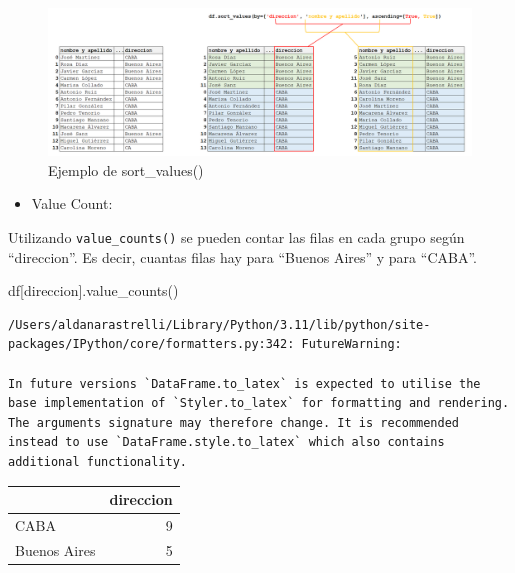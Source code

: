 \documentclass[
  letterpaper,
  DIV=11,
  numbers=noendperiod]{scrreprt}
\newenvironment{Shaded}{\begin{snugshade}}{\end{snugshade}}
\newcommand{\NormalTok}[1]{\textcolor[rgb]{0.00,0.23,0.31}{#1}}
\newcommand{\StringTok}[1]{\textcolor[rgb]{0.13,0.47,0.30}{#1}}
\providecommand{\tightlist}{%
  \setlength{\itemsep}{0pt}\setlength{\parskip}{0pt}}\usepackage{longtable,booktabs,array}
\begin{document}
\begin{figure}[H]

{\centering \includegraphics{./imgs/unidad_6/sortvalues.png}

}

\caption{Ejemplo de sort\_values()}

\end{figure}%

\begin{itemize}
\tightlist
\item
  Value Count:
\end{itemize}

Utilizando \texttt{value\_counts()} se pueden contar las filas en cada
grupo según ``direccion''. Es decir, cuantas filas hay para ``Buenos
Aires'' y para ``CABA''.

\begin{Shaded}
\begin{Highlighting}[]
\NormalTok{df[}\StringTok{\textquotesingle{}direccion\textquotesingle{}}\NormalTok{].value\_counts()}
\end{Highlighting}
\end{Shaded}

\begin{verbatim}
/Users/aldanarastrelli/Library/Python/3.11/lib/python/site-packages/IPython/core/formatters.py:342: FutureWarning:

In future versions `DataFrame.to_latex` is expected to utilise the base implementation of `Styler.to_latex` for formatting and rendering. The arguments signature may therefore change. It is recommended instead to use `DataFrame.style.to_latex` which also contains additional functionality.
\end{verbatim}

\begin{tabular}{lr}
\toprule
{} &  direccion \\
\midrule
CABA         &          9 \\
Buenos Aires &          5 \\
\bottomrule
\end{tabular}
\end{document}
